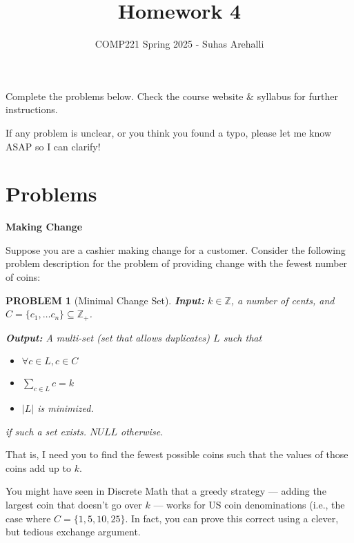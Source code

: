 \documentclass{exam}
\title{Homework 4}
\author{COMP221 Spring 2025 - Suhas Arehalli}
\date{}
\theoremstyle{prob}
\newtheorem*{probstate}{PROBLEM}
\begin{document}
\maketitle

Complete the problems below. Check the course website \& syllabus for further instructions.

If any problem is unclear, or you think you found a typo, please let me know ASAP so I can clarify!

\section*{Problems}

\begin{questions}
    \question \textbf{Making Change} 
    
    Suppose you are a cashier making change for a customer. Consider the following problem description for the problem of providing change with the fewest number of coins:
    \begin{probstate}[Minimal Change Set]
        \textbf{Input:} $k \in \mathbb{Z}$, a number of cents, and $C = \{c_1, \dots c_n\} \subseteq \mathbb{Z}_+$. 
        
        \textbf{Output:} A multi-set (set that allows duplicates) $L$ such that 
        \begin{itemize}
            \item $\forall c \in L, c \in C$
            \item $\sum_{c \in L} c = k$
            \item $\lvert L \rvert$ is minimized.
        \end{itemize}
        if such a set exists. $NULL$ otherwise.
    \end{probstate}
    That is, I need you to find the fewest possible coins such that the values of those coins add up to $k$. 

    You might have seen in Discrete Math that a greedy strategy --- adding the largest coin that doesn't go over $k$ --- works for US coin denominations (i.e., the case where $C = \{1, 5, 10, 25\}$. In fact, you can prove this correct using a clever, but tedious exchange argument.
\end{questions}
\end{document}
